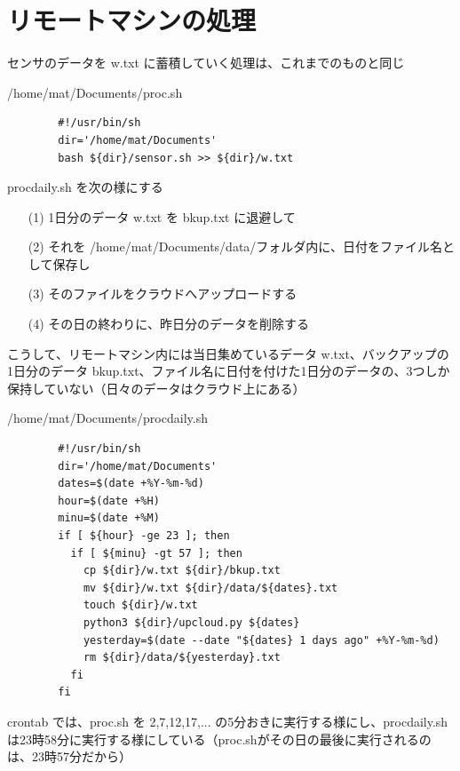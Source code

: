 \documentclass[12pt,a4j]{jsbook}
\begin{document}
\section{リモートマシンの処理}

センサのデータを w.txt に蓄積していく処理は、これまでのものと同じ

\begin{spacing}{0.95}
\begin{itembox}[l]{/home/mat/Documents/proc.sh}
\begin{verbatim}
		#!/usr/bin/sh
		dir='/home/mat/Documents'
		bash ${dir}/sensor.sh >> ${dir}/w.txt
\end{verbatim}
\end{itembox}
\end{spacing}

procdaily.sh を次の様にする

\begin{enumerate}
\item[(1)] 1日分のデータ w.txt を bkup.txt に退避して
\item[(2)] それを /home/mat/Documents/data/フォルダ内に、日付をファイル名として保存し
\item[(3)] そのファイルをクラウドへアップロードする
\item[(4)] その日の終わりに、昨日分のデータを削除する
\end{enumerate}

こうして、リモートマシン内には当日集めているデータ w.txt、バックアップの1日分のデータ bkup.txt、ファイル名に日付を付けた1日分のデータの、3つしか保持していない（日々のデータはクラウド上にある）

\begin{spacing}{0.95}
\begin{itembox}[l]{/home/mat/Documents/procdaily.sh}
\begin{verbatim}
		#!/usr/bin/sh
		dir='/home/mat/Documents'
		dates=$(date +%Y-%m-%d)
		hour=$(date +%H)
		minu=$(date +%M)
		if [ ${hour} -ge 23 ]; then
		  if [ ${minu} -gt 57 ]; then
		    cp ${dir}/w.txt ${dir}/bkup.txt
		    mv ${dir}/w.txt ${dir}/data/${dates}.txt
		    touch ${dir}/w.txt
		    python3 ${dir}/upcloud.py ${dates}
		    yesterday=$(date --date "${dates} 1 days ago" +%Y-%m-%d)
		    rm ${dir}/data/${yesterday}.txt
		  fi
		fi
\end{verbatim}
\end{itembox}
\end{spacing}

\newpage

crontab では、proc.sh を 2,7,12,17,... の5分おきに実行する様にし、procdaily.sh は23時58分に実行する様にしている（proc.shがその日の最後に実行されるのは、23時57分だから）
\end{document}
